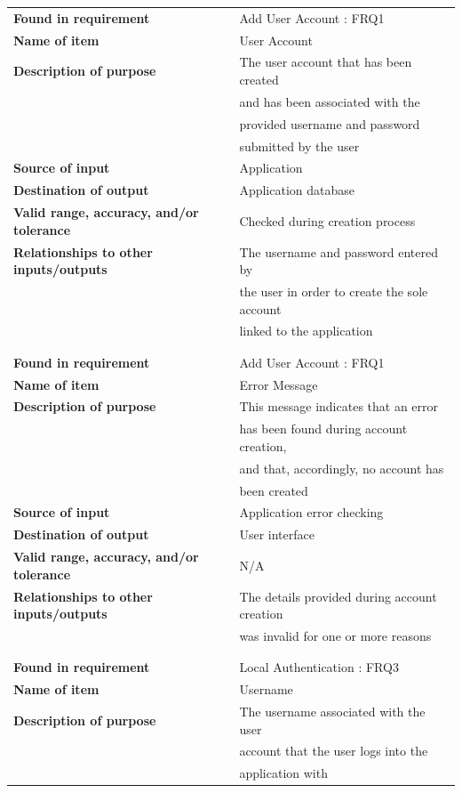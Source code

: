 \begin{tabular}{ll}
\textbf{Found in requirement}&Add User Account : FRQ1\\
\textbf{Name of item}&User Account\\
\textbf{Description of purpose}&The user account that has been created \\&and has been associated with the\\& provided username and password \\&submitted by the user\\
\textbf{Source of input}&Application\\
\textbf{Destination of output}&Application database\\
\textbf{Valid range, accuracy, and/or tolerance}&Checked during creation process\\
\textbf{Relationships to other inputs/outputs}&The username and password entered by\\& the user in order to create the sole account\\& linked to the application\\
&\\
&\\
\textbf{Found in requirement}&Add User Account : FRQ1\\
\textbf{Name of item}&Error Message\\
\textbf{Description of purpose}&This message indicates that an error \\&has been found during account creation, \\&and that, accordingly, no account has \\&been created\\
\textbf{Source of input}&Application error checking\\
\textbf{Destination of output}&User interface\\
\textbf{Valid range, accuracy, and/or tolerance}&N/A\\
\textbf{Relationships to other inputs/outputs}&The details provided during account creation\\& was invalid for one or more reasons\\
&\\
&\\
\textbf{Found in requirement}&Local Authentication : FRQ3\\
\textbf{Name of item}&Username\\
\textbf{Description of purpose}&The username associated with the user \\&account that the user logs into the\\& application with\\

\end{tabular}
